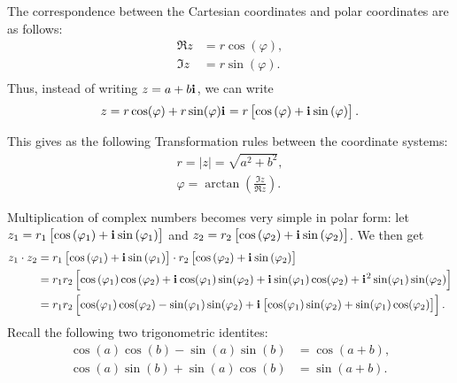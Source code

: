 \documentclass{article}
\newcommand{\iu}{\mathbf{i}\mkern1mu}
\newcommand{\cnorm}[1]{\left|#1\right|}
\newcommand{\zpolar}[2]{#1\left[\cos\left(#2\right)+\iu\sin\left(#2\right)\right]}
\begin{document}
The correspondence between the Cartesian coordinates and polar coordinates are as follows:
\begin{equation}
	\begin{aligned}
		\Re{z} & = r\cos\left(\varphi\right), \\
		\Im{z} & = r\sin\left(\varphi\right). \\
	\end{aligned}
	\label{polar_to_cartesian_trans}
\end{equation}
Thus, instead of writing $z=a+b\iu$, we can write
\begin{equation}
	z = r\cos(\varphi) + r\sin(\varphi)\iu = \zpolar{r}{\varphi}.
	\label{eq:}
\end{equation}

This gives as the following Transformation rules between the coordinate systems:
\begin{equation}
	\begin{aligned}
		r = \cnorm{z} = \sqrt{a^{2}+b^{2}}, \\
		\varphi = \arctan\left(\frac{\Im{z}}{\Re{z}}\right).
	\end{aligned}
	\label{eq:cartesian_to_polar_trans}
\end{equation}

Multiplication of complex numbers becomes very simple in polar form: let $z_{1}=\zpolar{r_{1}}{\varphi_{1}}$ and $z_{2}=\zpolar{r_{2}}{\varphi_{2}}$. We then get
\begin{equation}
	\begin{aligned}
		z_{1}\cdot z_{2} & = \zpolar{r_{1}}{\varphi_{1}}\cdot\zpolar{r_{2}}{\varphi_{2}}                                                                                                                                                  \\
		                 & = r_{1}r_{2}\left[\cos\left(\varphi_{1}\right)\cos\left(\varphi_{2}\right) + \iu\cos(\varphi_{1})\sin(\varphi_{2}) + \iu\sin(\varphi_{1})\cos(\varphi_{2}) + \iu^{2}\sin(\varphi_{1})\sin(\varphi_{2}) \right] \\
		                 & = r_{1}r_{2}\left[\cos(\varphi_{1})\cos(\varphi_{2})-\sin(\varphi_{1})\sin(\varphi_{2}) + \iu\left[\cos(\varphi_{1})\sin(\varphi_{2})+\sin(\varphi_{1})\cos(\varphi_{2})\right]\right].
	\end{aligned}
	\label{eq:complex_product_polar_form_part_1}
\end{equation}
Recall the following two trigonometric identites:
\begin{equation}
	\begin{aligned}
		\cos(a)\cos(b)-\sin(a)\sin(b) & = \cos(a+b), \\
		\cos(a)\sin(b)+\sin(a)\cos(b) & = \sin(a+b).
	\end{aligned}
	\label{eq:trig_identites}
\end{equation}
\end{document}
